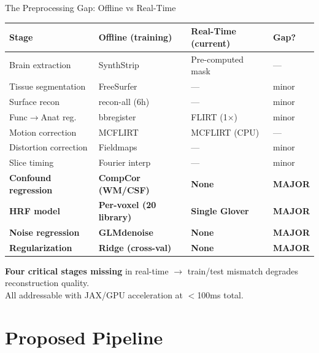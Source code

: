 \documentclass[aspectratio=169,12pt]{beamer}
\begin{document}

\begin{frame}{The Preprocessing Gap: Offline vs Real-Time}
\footnotesize
\centering
\begin{tabular}{@{}l l l l@{}}
\toprule
\textbf{Stage} & \textbf{Offline (training)} & \textbf{Real-Time (current)} & \textbf{Gap?} \\
\midrule
Brain extraction & SynthStrip & Pre-computed mask & --- \\
Tissue segmentation & FreeSurfer & --- & minor \\
Surface recon & recon-all (6h) & --- & minor \\
Func$\rightarrow$Anat reg. & bbregister & FLIRT (1$\times$) & minor \\
Motion correction & MCFLIRT & MCFLIRT (CPU) & --- \\
Distortion correction & Fieldmaps & --- & minor \\
Slice timing & Fourier interp & --- & minor \\
\textbf{Confound regression} & \textbf{CompCor (WM/CSF)} & \textcolor{softred}{\textbf{None}} & \textcolor{softred}{\textbf{MAJOR}} \\
\midrule
\textbf{HRF model} & \textbf{Per-voxel (20 library)} & \textcolor{softred}{\textbf{Single Glover}} & \textcolor{softred}{\textbf{MAJOR}} \\
\textbf{Noise regression} & \textbf{GLMdenoise} & \textcolor{softred}{\textbf{None}} & \textcolor{softred}{\textbf{MAJOR}} \\
\textbf{Regularization} & \textbf{Ridge (cross-val)} & \textcolor{softred}{\textbf{None}} & \textcolor{softred}{\textbf{MAJOR}} \\
\bottomrule
\end{tabular}

\vspace{0.8em}
\normalsize
\textcolor{softred}{\textbf{Four critical stages missing}} in real-time $\rightarrow$ train/test mismatch degrades reconstruction quality.\\
All addressable with JAX/GPU acceleration at $<$100ms total.
\end{frame}

\section{Proposed Pipeline}
\end{document}
